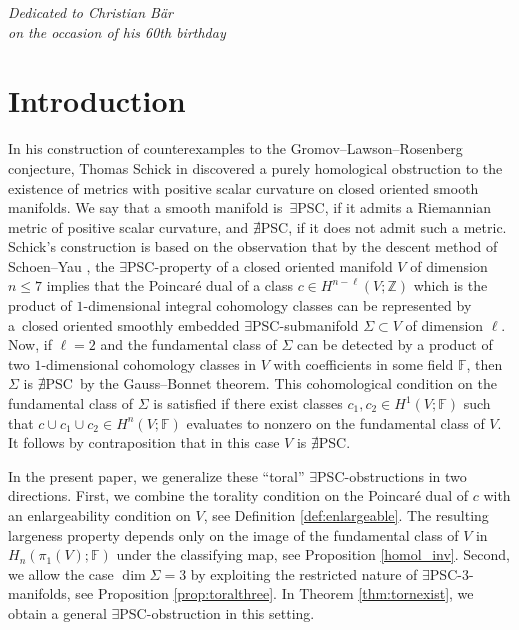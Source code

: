 \documentclass[pdftex]{sigma}
\numberwithin{equation}{section}
\newcommand{\F}{\mathbb{F}}
\newcommand{\Z}{\mathbb{Z}}
\newcommand{\no}{{\color{brown!70!black}$\nexists$}{\sf PSC}}
\newcommand{\yes}{{\color {blue!70!black}$\exists$}{\sf PSC}}
\begin{document}
\begin{flushright}
\begin{minipage}{60mm}
\it Dedicated to Christian B\"ar\\
 on the occasion of his 60th birthday
 \end{minipage}
\end{flushright}

\renewcommand{\thefootnote}{\arabic{footnote}}
\setcounter{footnote}{0}


\section{Introduction}

In his construction of counterexamples to the Gromov--Lawson--Rosenberg conjecture, Thomas Schick in \cite{Sch98} discovered a purely homological obstruction to the existence of metrics with positive scalar curvature on closed oriented smooth manifolds.
We say that a smooth manifold is~\yes, if it admits a Riemannian metric of positive scalar curvature, and \no, if it does not admit such a metric.
Schick's construction is based on the observation that by the descent method of Schoen--Yau \cite{S-Y1979,SY}, the \yes-property of a closed oriented manifold $V$ of dimension~${n \leq 7}$ implies that the Poincar\'e dual of a class $c \in H^{n-\ell}(V; \Z)$ which is the product of $1$-dimensional integral cohomology classes can be represented by a~closed oriented smoothly embedded \yes-submanifold $\Sigma \subset V$ of dimension $\ell$.
Now, if $\ell = 2$ and the fundamental class of $\Sigma$ can be detected by a product of two $1$-dimensional cohomology classes in $V$ with coefficients in some field $\F$, then $\Sigma$ is \no~by the Gauss--Bonnet theorem.
This cohomological condition on the fundamental class of $\Sigma$ is satisfied if there exist classes $c_1, c_2 \in H^1(V; \F)$ such that $c \cup c_1 \cup c_2 \in H^n(V; \F)$ evaluates to nonzero on the fundamental class of $V$.
It follows by contraposition that in this case $V$ is \no.

In the present paper, we generalize these ``toral'' \yes-obstructions in two directions.
First, we combine the torality condition on the Poincar\'e dual of $c$ with an enlargeability condition on $V$, see Definition \ref{def:enlargeable}.
The resulting largeness property depends only on the image of the fundamental class of $V$ in $H_n( \pi_1(V) ; \F)$ under the classifying map, see Proposition \ref{homol_inv}.
Second, we allow the case $\dim \Sigma = 3$ by exploiting the restricted nature of \yes-$3$-manifolds, see Proposition \ref{prop:toralthree}.
In Theorem \ref{thm:tornexist}, we obtain a general \yes-obstruction in this setting.
\end{document}
